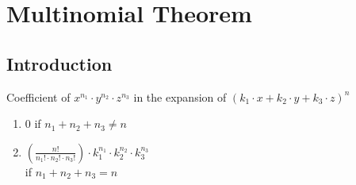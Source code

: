 \documentclass[12pt]{article}
\begin{document}
\section{Multinomial Theorem}
\subsection{Introduction}
Coefficient of $x^{n_1}\cdot y^{n_2}\cdot z^{n_3}$ in the expansion of $(k_1\cdot x+k_2\cdot y+k_3\cdot z)^n$
\begin{enumerate}
    \item $0$ if $n_1+n_2+n_3 \ne n$ 
    \item $\left(\frac{n!}{n_1! \cdot n_2! \cdot n_3! }\right)\cdot k_1^{n_1}\cdot k_2^{n_2}\cdot k_3^{n_3}$ \\ if $n_1+n_2+n_3 = n$
\end{enumerate}
\end{document}
